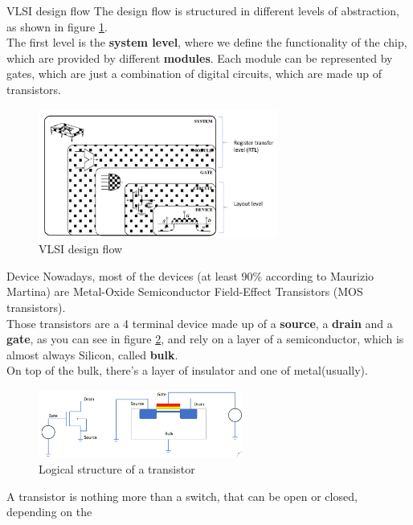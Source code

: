\begin{section}{VLSI design flow}
  The design flow is structured in different levels of abstraction, as shown in figure \ref{fig:vlsi design flow}.\\
  The first level is the \textbf{system level}, where we define the functionality of the chip, 
  which are provided by different \textbf{modules}. Each module can be represented by gates, which 
  are just a combination of digital circuits, which are made up of transistors.\\
  \begin{figure}[H]
    \centering
    \includegraphics[width=0.7\textwidth]{img/hardware/vlsi design flow16.png}
    \caption{VLSI design flow}
    \label{fig:vlsi design flow}
  \end{figure}
  \begin{subsection}{Device}
    Nowadays, most of the devices (at least 90\% according to Maurizio Martina) are Metal-Oxide 
    Semiconductor Field-Effect Transistors (MOS transistors).\\
    Those transistors are a 4 terminal device made up of a \textbf{source}, a \textbf{drain} and a 
    \textbf{gate}, as you can see in figure \ref{fig:transistor}, and rely on a layer of a 
    semiconductor, which is almost always Silicon, called \textbf{bulk}.\\
    On top of the bulk, there's a layer of insulator and one of metal(usually).
    \begin{figure}[H]
      \centering
      \includegraphics[width=0.6\textwidth]{img/hardware/transistor.png}
      \caption{Logical structure of a transistor}
      \label{fig:transistor}
    \end{figure}
    A transistor is nothing more than a switch, that can be open or closed, depending on the

\end{subsection}
\end{section}
